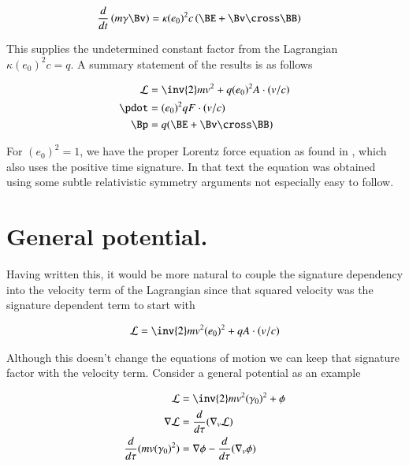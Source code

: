 \begin{align*}
\frac{d}{dt}\left( m \gamma \Bv \right) &= \kappa (e_0)^2 c \left( \BE + \Bv \cross \BB \right)
\end{align*}

This supplies the undetermined constant factor from the Lagrangian $\kappa (e_0)^2 c = q$.  A summary statement of the results is as follows

\begin{align}
\LL &= \inv{2} m v^2 + q (e_0)^2 A \cdot (v/c) \\
\pdot &= (e_0)^2 q F \cdot (v/c) \\
\Bp &= q (\BE + \Bv \cross \BB)
\end{align}

For $(e_0)^2 = 1$, we have the proper Lorentz force equation as found in
\cite{doran2003gap}, which also uses the positive time signature.  In that text the equation was obtained using some subtle relativistic symmetry arguments not especially easy to follow.

\section{General potential. }

Having written this, it would be more natural to couple the signature dependency into the velocity term of the Lagrangian since that squared velocity was the 
signature dependent term to start with

\begin{align*}
\LL &= \inv{2} m v^2 (e_0)^2 + q A \cdot (v/c) \\
\end{align*}

Although this doesn't change the equations of motion we can keep that signature factor with the velocity term.  Consider a general potential as an example

\begin{align*}
\LL &= \inv{2}m v^2 (\gamma_0)^2 + \phi \\
\grad \LL &= \frac{d}{d\tau}(\grad_v \LL) \\
\frac{d}{d\tau}(m v (\gamma_0)^2) &= \grad \phi - \frac{d}{d\tau}(\grad_v \phi) \\
\end{align*}


%
%
